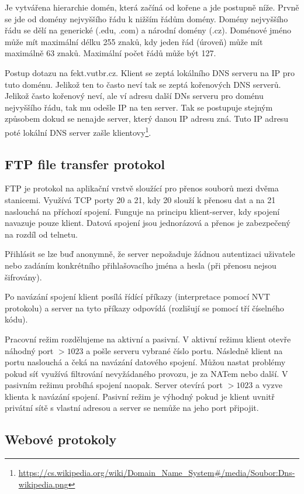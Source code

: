 Je vytvářena hierarchie domén, která začíná od kořene a jde postupně níže. Prvně se jde od domény nejvyššího řádu k nižším řádům domény. Domény nejvyššího řádu se dělí na generické (.edu, .com) a národní domény (.cz). Doménové jméno může mít maximální délku 255 znaků, kdy jeden řád (úroveň) může mít maximálně 63 znaků. Maximální počet řádů může být 127. 

Postup dotazu na fekt.vutbr.cz. Klient se zeptá lokálního DNS serveru na IP pro tuto doménu. Jelikož ten to často neví tak se zeptá kořenových DNS serverů. Jelikož často kořenový neví, ale ví adresu další DNs serveru pro doménu nejvyššího řádu, tak mu odešle IP na ten server. Tak se postupuje stejným způsobem dokud se nenajde server, který danou IP adresu zná. Tuto IP adresu poté lokální DNS server zašle klientovy\footnote{\url{https://cs.wikipedia.org/wiki/Domain_Name_System\#/media/Soubor:Dns-wikipedia.png}}. 

\subsection{FTP file transfer protokol}

FTP je protokol na aplikační vrstvě sloužící pro přenos souborů mezi dvěma stanicemi. Využívá TCP porty 20 a 21, kdy 20 slouží k přenosu dat a na 21 naslouchá na příchozí spojení. Funguje na principu klient-server, kdy spojení navazuje pouze klient. Datová spojení jsou jednorázová a přenos je zabezpečený na rozdíl od telnetu. 

Přihlásit se lze buď anonymně, že server nepožaduje žádnou autentizaci uživatele nebo zadáním konkrétního přihlašovacího jména a hesla (při přenosu nejsou šifrovány).

Po navázání spojení klient posílá řídící příkazy (interpretace pomocí NVT protokolu) a server na tyto příkazy odpovídá (rozlišují se pomocí tří číselného kódu).

Pracovní režim rozdělujeme na aktivní a pasivní. V aktivní režimu klient otevře náhodný port $> 1023$ a pošle serveru vybrané číslo portu. Následně klient na portu naslouchá a čeká na navázání datového spojení. Můžou nastat problémy pokud síť využívá filtrování nevyžádaného provozu, je za NATem nebo další. V pasivním režimu probíhá spojení naopak. Server otevírá port $> 1023$ a vyzve klienta k navázání spojení. Pasivní režim je výhodný pokud je klient uvnitř privátní sítě s vlastní adresou a server se nemůže na jeho port připojit.

\subsection{Webové protokoly}

